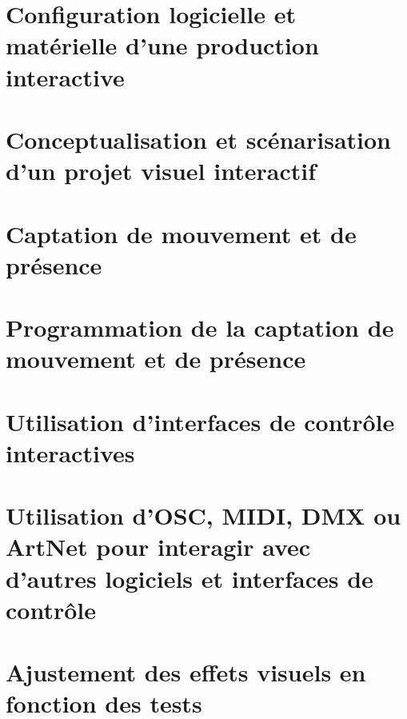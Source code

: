 \documentclass[
]{book}
\begin{document}
\hypertarget{configuration-logicielle-et-matuxe9rielle-dune-production-interactive}{%
\section{Configuration logicielle et matérielle d'une production interactive}\label{configuration-logicielle-et-matuxe9rielle-dune-production-interactive}}

\hypertarget{conceptualisation-et-scuxe9narisation-dun-projet-visuel-interactif}{%
\section{Conceptualisation et scénarisation d'un projet visuel interactif}\label{conceptualisation-et-scuxe9narisation-dun-projet-visuel-interactif}}

\hypertarget{captation-de-mouvement-et-de-pruxe9sence}{%
\section{Captation de mouvement et de présence}\label{captation-de-mouvement-et-de-pruxe9sence}}

\hypertarget{programmation-de-la-captation-de-mouvement-et-de-pruxe9sence}{%
\section{Programmation de la captation de mouvement et de présence}\label{programmation-de-la-captation-de-mouvement-et-de-pruxe9sence}}

\hypertarget{utilisation-dinterfaces-de-contruxf4le-interactives}{%
\section{Utilisation d'interfaces de contrôle interactives}\label{utilisation-dinterfaces-de-contruxf4le-interactives}}

\hypertarget{utilisation-dosc-midi-dmx-ou-artnet-pour-interagir-avec-dautres-logiciels-et-interfaces-de-contruxf4le}{%
\section{Utilisation d'OSC, MIDI, DMX ou ArtNet pour interagir avec d'autres logiciels et interfaces de contrôle}\label{utilisation-dosc-midi-dmx-ou-artnet-pour-interagir-avec-dautres-logiciels-et-interfaces-de-contruxf4le}}

\hypertarget{ajustement-des-effets-visuels-en-fonction-des-tests}{%
\section{Ajustement des effets visuels en fonction des tests}\label{ajustement-des-effets-visuels-en-fonction-des-tests}}
\end{document}
